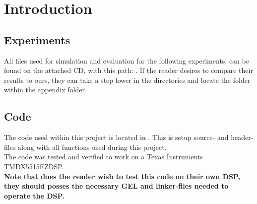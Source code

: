 \section*{Introduction}

\subsection*{Experiments}
All files used for simulation and evaluation for the following experiments, can be found on the attached CD, with this path: . If the reader desires to compare their results to ours, they can take a step lower in the directories and locate the folder  within the appendix folder. \\

\subsection*{Code}
The code used within this project is located in . This is setup source- and header-files along with all functions used during this project.\\
The code was tested and verified to work on a Texas Instruments TMDX5515EZDSP. \\

\textbf{Note that does the reader wish to test this code on their own DSP, they should posses the necessary GEL and linker-files needed to operate the DSP.}
